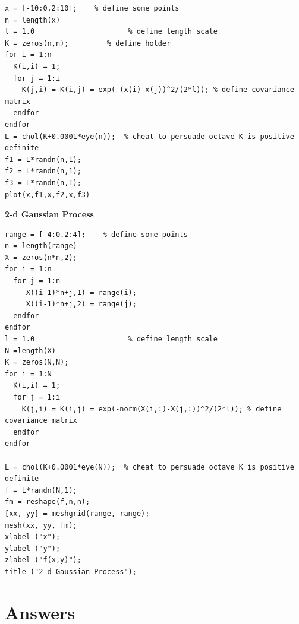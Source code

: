 \documentclass[11pt]{article}
\begin{document}
\begin{verbatim}
x = [-10:0.2:10];    % define some points
n = length(x)
l = 1.0                      % define length scale
K = zeros(n,n);         % define holder
for i = 1:n
  K(i,i) = 1;
  for j = 1:i
    K(j,i) = K(i,j) = exp(-(x(i)-x(j))^2/(2*l)); % define covariance matrix
  endfor
endfor
L = chol(K+0.0001*eye(n));  % cheat to persuade octave K is positive definite
f1 = L*randn(n,1);
f2 = L*randn(n,1);
f3 = L*randn(n,1);
plot(x,f1,x,f2,x,f3)
\end{verbatim}

\textbf{2-d Gaussian Process}

\begin{verbatim}
range = [-4:0.2:4];    % define some points
n = length(range)
X = zeros(n*n,2);
for i = 1:n
  for j = 1:n
     X((i-1)*n+j,1) = range(i);
     X((i-1)*n+j,2) = range(j);
  endfor
endfor
l = 1.0                      % define length scale
N =length(X)
K = zeros(N,N);  
for i = 1:N
  K(i,i) = 1;
  for j = 1:i
    K(j,i) = K(i,j) = exp(-norm(X(i,:)-X(j,:))^2/(2*l)); % define covariance matrix
  endfor
endfor

L = chol(K+0.0001*eye(N));  % cheat to persuade octave K is positive definite
f = L*randn(N,1);
fm = reshape(f,n,n);
[xx, yy] = meshgrid(range, range);
mesh(xx, yy, fm);
xlabel ("x");
ylabel ("y");
zlabel ("f(x,y)");
title ("2-d Gaussian Process");
\end{verbatim}
\section{Answers}
\label{sec:orgda3b0e5}
\end{document}
